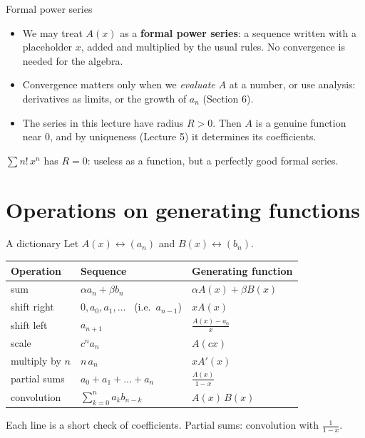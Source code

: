 \documentclass{wosm-slides}
\begin{document}
\begin{frame}{Formal power series}
  \begin{itemize}
    \item We may treat $A(x)$ as a \textbf{formal power series}: a sequence written with a
      placeholder $x$, added and multiplied by the usual rules. No convergence is needed for the
      algebra.
    \item Convergence matters only when we \emph{evaluate} $A$ at a number, or use analysis:
      derivatives as limits, or the growth of $a_n$ (Section 6).
    \item The series in this lecture have radius $R > 0$. Then $A$ is a genuine function near
      $0$, and by uniqueness (Lecture 5) it determines its coefficients.
  \end{itemize}
  \pause
  \begin{example}
    $\sum n!\, x^n$ has $R = 0$: useless as a function, but a perfectly good formal series.
  \end{example}
\end{frame}

\section{Operations on generating functions}

\begin{frame}{A dictionary}
  Let $A(x) \leftrightarrow (a_n)$ and $B(x) \leftrightarrow (b_n)$.
  \begin{center}
  \small\renewcommand{\arraystretch}{1.22}
  \begin{tabular}{@{}lll@{}}
    \toprule
    \textbf{Operation} & \textbf{Sequence} & \textbf{Generating function} \\
    \midrule
    sum            & $\alpha a_n + \beta b_n$ & $\alpha A(x) + \beta B(x)$ \\
    shift right    & $0, a_0, a_1, \dots$ \ (i.e.\ $a_{n-1}$) & $x A(x)$ \\
    shift left     & $a_{n+1}$                & $\frac{A(x) - a_0}{x}$ \\
    scale          & $c^n a_n$                & $A(cx)$ \\
    multiply by $n$ & $n\, a_n$               & $x A'(x)$ \\
    partial sums   & $a_0 + a_1 + \dots + a_n$ & $\frac{A(x)}{1 - x}$ \\
    convolution    & $\sum_{k=0}^n a_k b_{n-k}$ & $A(x)\, B(x)$ \\
    \bottomrule
  \end{tabular}
  \end{center}
  {\small Each line is a short check of coefficients. Partial sums: convolution with $\frac{1}{1-x}$.\par}
\end{frame}
\end{document}
